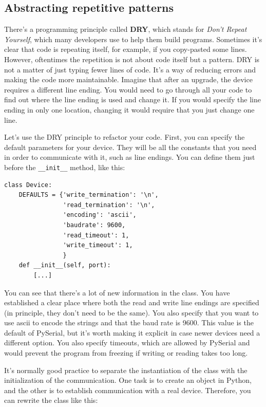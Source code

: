 \subsection{Abstracting repetitive patterns}\label{subsec:abstracting-repetitive-patterns}
There's a programming principle called \textbf{DRY}, which stands for \emph{Don't Repeat Yourself}, which many developers use to help them build programs. Sometimes it's clear that code is repeating itself, for example, if you copy-pasted some lines. However, oftentimes the repetition is not about code itself but a pattern. {DRY} is not a matter of just typing fewer lines of code. It's a way of reducing errors and making the code more maintainable. Imagine that after an upgrade, the device requires a different line ending. You would need to go through all your code to find out where the line ending is used and change it. If you would specify the line ending in only one location, changing it would require that you just change one line.

Let's use the DRY principle to refactor your code. First, you can specify the default parameters for your device. They will be all the constants that you need in order to communicate with it, such as line endings. You can define them just before the \texttt{__init__} method, like this:

\begin{verbatim}
class Device:
    DEFAULTS = {'write_termination': '\n',
                'read_termination': '\n',
                'encoding': 'ascii',
                'baudrate': 9600,
                'read_timeout': 1,
                'write_timeout': 1,
                }
    def __init__(self, port):
        [...]
\end{verbatim}

You can see that there's a lot of new information in the class. You have established a clear place where both the read and write line endings are specified (in principle, they don't need to be the same). You also specify that you want to use ascii to encode the strings and that the baud rate is 9600. This value is the default of PySerial, but it's worth making it explicit in case newer devices need a different option. You also specify timeouts, which are allowed by PySerial and would prevent the program from freezing if writing or reading takes too long.

It's normally good practice to separate the instantiation of the class with the initialization of the communication. One task is to create an object in Python, and the other is to establish communication with a real device. Therefore, you can rewrite the class like this:

